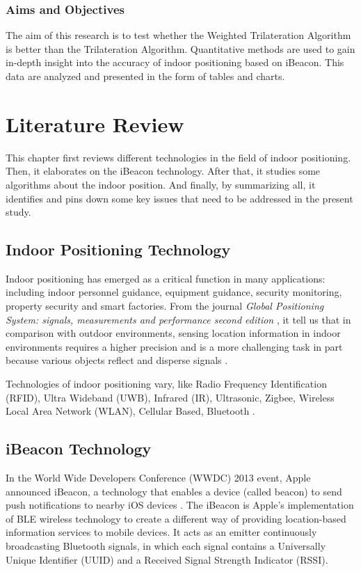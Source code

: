 \documentclass{sigchi}
\begin{document}
\subsubsection{Aims and Objectives}

The aim of this research is to test whether the Weighted Trilateration Algorithm is better than the Trilateration Algorithm.
Quantitative methods are used to gain in-depth insight into the accuracy of indoor positioning based on iBeacon. This data are analyzed and presented in the form of tables and charts.


\section{Literature Review}

This chapter first reviews different technologies in the field of indoor positioning. Then, it elaborates on the iBeacon technology. After that, it studies some algorithms about the indoor position. And finally, by summarizing all, it identifies and pins down some key issues that need to be addressed in the present study.

\subsection{Indoor Positioning Technology}

Indoor positioning has emerged as a critical function in many applications: including indoor personnel guidance, equipment guidance, security monitoring, property security and smart factories. From the journal \emph{Global Positioning System: signals, measurements and performance second edition} \cite{alarifi2016ultra}, it tell us that in comparison with outdoor environments, sensing location information in indoor environments requires a higher precision and is a more challenging task in part because various objects reflect and disperse signals . 

Technologies of indoor positioning vary, like Radio Frequency Identification (RFID), Ultra Wideband (UWB), Infrared (IR), Ultrasonic, Zigbee, Wireless Local Area Network (WLAN), Cellular Based, Bluetooth \cite{mautz2012indoor}. 

\subsection{iBeacon Technology}

In the World Wide Developers Conference (WWDC) 2013 event, Apple announced iBeacon, a technology that enables a device (called beacon) to send push notifications to nearby iOS devices \cite{conte2014bluesentinel}. The iBeacon is Apple's implementation of BLE wireless technology to create a different way of providing location-based information services to mobile devices. It acts as an emitter continuously broadcasting Bluetooth signals, in which each signal contains a Universally Unique Identifier (UUID) and a Received Signal Strength Indicator (RSSI).
\end{document}
